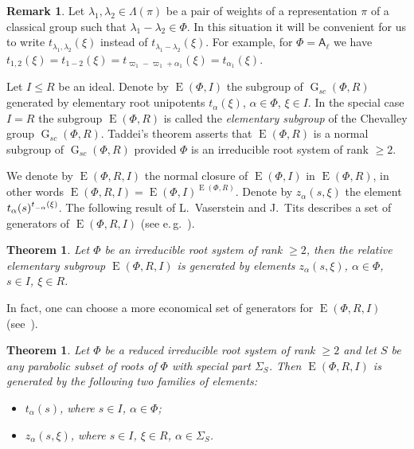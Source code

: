 \documentclass[12pt]{amsart}
\numberwithin{equation}{section}
\newcounter{thmcounter} \newcounter{lemmacounter}
\newtheorem{thm}[thmcounter]{Theorem}
\theoremstyle{definition}
\newtheorem{rem}[equation]{Remark}
\DeclareMathOperator{\G}{G}
\DeclareMathOperator{\E}{E}
\newcommand{\rA}{\mathsf{A}}
\def\ssub#1{\mathchoice
   {_{\lower2pt\hbox{$\scriptstyle #1$}}}
   {_{\lower2pt\hbox{$\scriptstyle #1$}}}
   {_{\lower1.5pt\hbox{$\scriptscriptstyle #1$}}}
   {_{\!\lower1.5pt\hbox{$\scriptscriptstyle #1$}}}}
\begin{document}
\begin{rem} Let $\lambda_1, \lambda_2 \in \Lambda(\pi)$ be a pair of weights of a representation $\pi$ of a classical group such that $\lambda_1-\lambda_2\in \Phi$.
In this situation it will be convenient for us to write $t_{\lambda_1,\lambda_2}(\xi)$ instead of $t_{\lambda_1-\lambda_2}(\xi)$.
For example, for $\Phi=\rA_\ell$ we have $t_{1,2}(\xi)=t_{1-2}(\xi)=t_{\varpi_1 - \varpi_1 + \alpha_1}(\xi) = t_{\alpha_1}(\xi)$. \end{rem}

Let $I\leq R$ be an ideal. Denote by $\E(\Phi, I)$ the subgroup of $\G_{sc}(\Phi, R)$ generated by elementary root unipotents $t_\alpha(\xi)$, $\alpha\in\Phi$, $\xi\in I$.
In the special case $I=R$ the subgroup $\E(\Phi, R)$ is called the {\it elementary subgroup} of the Chevalley group $\G_{sc}(\Phi, R)$.
Taddei's theorem asserts that $\E(\Phi, R)$ is a normal subgroup of $\G_{sc}(\Phi, R)$ provided $\Phi$ is an irreducible root system of rank $\geq 2$.

We denote by $\E(\Phi, R, I)$ the normal closure of $\E(\Phi, I)$ in $\E(\Phi, R)$, in other words $\E(\Phi, R, I) = \E(\Phi, I)^{\E(\Phi, R)}$.
Denote by $z_\alpha(s, \xi)$ the element $t_\alpha(s)^{t\ssub{-\alpha}(\xi)}$.
The following result of L.~Vaserstein and J.~Tits describes a set of generators of $\E(\Phi, R, I)$ (see e.\,g.~\cite[Theorem~2]{Va86}).

\begin{thm} Let $\Phi$ be an irreducible root system of rank $\geq 2$, then the relative elementary subgroup $\E(\Phi, R, I)$
is generated by elements $z_\alpha(s, \xi)$, $\alpha\in \Phi$, $s\in I$, $\xi\in R$.
\end{thm}

In fact, one can choose a more economical set of generators for $\E(\Phi, R, I)$ (see~\cite[Theorem~3.4]{S}).
\begin{thm}\label{theorem:Stepanov}
Let $\Phi$ be a reduced irreducible root system of rank $\geq 2$ and let $S$ be any parabolic subset of roots of $\Phi$ with special part $\Sigma_S$.
Then $\E(\Phi, R, I)$ is generated by the following two families of elements:
\begin{itemize}
 \item $t_{\alpha}(s)$, where $s\in I$, $\alpha\in\Phi$;
 \item $z_\alpha(s,\xi)$, where $s\in I$, $\xi\in R$, $\alpha\in\Sigma_S$. \end{itemize} \end{thm}
 
\end{document}
